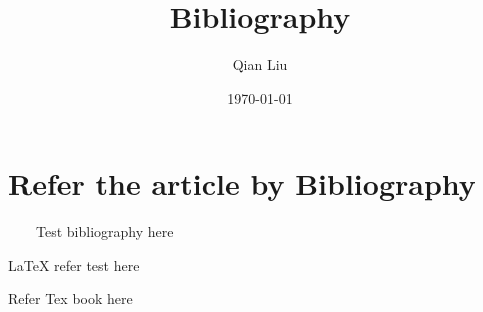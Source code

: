 \documentclass{article}
\author{Qian Liu}
\title{Bibliography}
\date{\today}
\begin{document}
    
\maketitle
\tableofcontents
\newpage

\section{Refer the article by Bibliography}
\ \ \ \ Test bibliography here\cite{knuth:1984} %

\LaTeX{} refer test here\cite{latex2e}

Refer Tex book here \cite{texbook}



\end{document}
